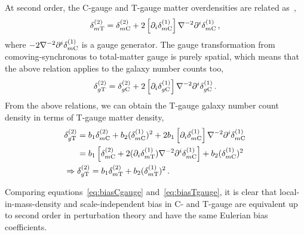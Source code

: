 At second order, the C-gauge and T-gauge matter overdensities are related as~\cite{Bertacca:2015mca,Villa:2015ppa}, 
\begin{equation}
	\delta_{m\mathrm{T}}^{(2)} = \delta_{m\mathrm{C}}^{(2)} + 2 \left[ \partial_i \delta_{m\mathrm{C}}^{(1)} \right] \nabla^{-2} \partial^i \delta_{m\mathrm{C}}^{(1)}\,,
\end{equation}
where $-2\nabla^{-2} \partial^i \delta_{m\mathrm{C}}^{(1)}$ is a gauge generator. The gauge transformation from comoving-synchronous to total-matter gauge is purely spatial, which means that the above relation applies to the galaxy number counts too, 
\begin{equation}
	\delta_{g\mathrm{T}}^{(2)} = \delta_{g\mathrm{C}}^{(2)} + 2 \left[ \partial_i \delta_{g\mathrm{C}}^{(1)} \right] \nabla^{-2} \partial^i \delta_{g\mathrm{C}}^{(1)}\,.
\end{equation}
From the above relations, we can obtain the T-gauge galaxy number count density in terms of T-gauge matter density, 
\begin{align}
	&\delta_{g\mathrm{T}}^\tw = b_1 \delta_{m\cs}^\tw + b_2 (\delta_{m\cs}^\on)^2 + 2 b_1 \left[\partial_i \delta_{m\cs}^\on \right] \nabla^{-2} \partial^i \delta_{m\cs}^\on \\
	& \hphantom{\delta_{g\mathrm{T}}^\tw } = b_1 \left[ \delta_{m\cs}^\tw + 2 (\partial_i \delta_{m\mathrm{T}}^\on) \nabla^{-2} \partial^i \delta_{m\cs}^\on \right] + b_2 (\delta_{m\cs}^\on)^2 \\
	& \Rightarrow \delta_{g\mathrm{T}}^\tw = b_1 \delta_{m\mathrm{T}}^\tw + b_2 (\delta_{m\mathrm{T}}^\on)^2 \label{eq:biasTgauge} \,.
\end{align}

Comparing equations~\eqref{eq:biasCgauge} and~\eqref{eq:biasTgauge}, it is clear that local-in-mass-density and scale-independent bias in C- and T-gauge are equivalent up to second order in perturbation theory and have the same Eulerian bias coefficients. 

